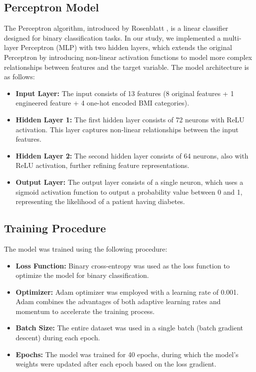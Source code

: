 \documentclass[10pt,twocolumn,letterpaper]{article}
\begin{document}
\subsection{Perceptron Model}
The Perceptron algorithm, introduced by Rosenblatt \cite{rosenblatt1958perceptron}, is a linear classifier designed for binary classification tasks. In our study, we implemented a multi-layer Perceptron (MLP) with two hidden layers, which extends the original Perceptron by introducing non-linear activation functions to model more complex relationships between features and the target variable. The model architecture is as follows:
\begin{itemize}
    \item \textbf{Input Layer:} The input consists of 13 features (8 original features + 1 engineered feature + 4 one-hot encoded BMI categories).
    \item \textbf{Hidden Layer 1:} The first hidden layer consists of 72 neurons with ReLU activation. This layer captures non-linear relationships between the input features.
    \item \textbf{Hidden Layer 2:} The second hidden layer consists of 64 neurons, also with ReLU activation, further refining feature representations.
    \item \textbf{Output Layer:} The output layer consists of a single neuron, which uses a sigmoid activation function to output a probability value between 0 and 1, representing the likelihood of a patient having diabetes.
\end{itemize}

\subsection{Training Procedure}
The model was trained using the following procedure:
\begin{itemize}
    \item \textbf{Loss Function:} Binary cross-entropy was used as the loss function to optimize the model for binary classification.
    \item \textbf{Optimizer:} Adam optimizer \cite{diederik2014adam} was employed with a learning rate of 0.001. Adam combines the advantages of both adaptive learning rates and momentum to accelerate the training process.
    \item \textbf{Batch Size:} The entire dataset was used in a single batch (batch gradient descent) during each epoch.
    \item \textbf{Epochs:} The model was trained for 40 epochs, during which the model’s weights were updated after each epoch based on the loss gradient.
\end{itemize}
\end{document}
